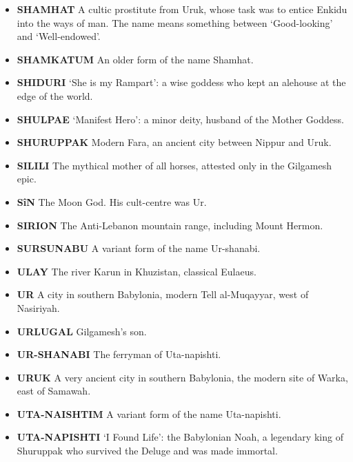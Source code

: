 \documentclass{article}
\begin{document}
\begin{multicols}{3}
\begin{small}
\begin{itemize}[
        label=,
        leftmargin=1.0em,
        itemindent=-1.0em,
        nosep,
    ]
    \item \textbf{SHAMHAT}
    A cultic prostitute from Uruk, whose task was to entice Enkidu into the
    ways of man. The name means something between `Good-looking' and
    `Well-endowed'.

    \item \textbf{SHAMKATUM}
    An older form of the name Shamhat.

    \item \textbf{SHIDURI}
    `She is my Rampart': a wise goddess who kept an alehouse at the edge of
    the world.

    \item \textbf{SHULPAE}
    `Manifest Hero': a minor deity, husband of the Mother Goddess.

    \item \textbf{SHURUPPAK}
    Modern Fara, an ancient city between Nippur and Uruk.

    \item \textbf{SILILI}
    The mythical mother of all horses, attested only in the Gilgamesh epic.

    \item \textbf{SîN}
    The Moon God. His cult-centre was Ur.

    \item \textbf{SIRION}
    The Anti-Lebanon mountain range, including Mount Hermon.

    \item \textbf{SURSUNABU}
    A variant form of the name Ur-shanabi.

    \item \textbf{ULAY}
    The river Karun in Khuzistan, classical Eulaeus.

    \item \textbf{UR}
    A city in southern Babylonia, modern Tell al-Muqayyar, west of
    Nasiriyah.

    \item \textbf{URLUGAL}
    Gilgamesh's son.

    \item \textbf{UR-SHANABI}
    The ferryman of Uta-napishti.

    \item \textbf{URUK}
    A very ancient city in southern Babylonia, the modern site of Warka,
    east of Samawah.

    \item \textbf{UTA-NAISHTIM}
    A variant form of the name Uta-napishti.

    \item \textbf{UTA-NAPISHTI}
    `I Found Life': the Babylonian Noah, a legendary king of Shuruppak who
    survived the Deluge and was made immortal.


\end{itemize}
\end{small}
\end{multicols}
\end{document}
